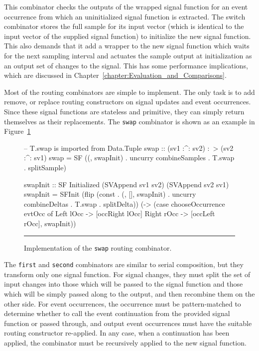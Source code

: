 This combinator checks the outputs of the wrapped
signal function for an event occurrence from which an uninitialized signal
function is extracted. The switch combinator stores the full sample
for its input vector (which is identical to the input vector of the supplied
signal function) to initialize the new signal function. This also demands that
it add a wrapper to the new signal function which waits for the next sampling
interval and actuates the sample output at initialization as an output set
of changes to the signal. This has some performance implications, which are
discussed in Chapter~\ref{chapter:Evaluation_and_Comparisons}.

Most of the routing combinators are simple to implement. The only task is to add
remove, or replace routing constructors on signal updates and event occurrences.
Since these signal functions are stateless and primitive, they can simply
return themselves as their replacements. The {\tt swap} combinator is shown as
an example in Figure~\ref{figure:swap_implementation}

\begin{figure}
\begin{code}
-- T.swap is imported from Data.Tuple
swap :: (sv1 :^: sv2) :~> (sv2 :^: sv1)
swap =
  SF ((, swapInit) . 
      uncurry combineSamples .
      T.swap . splitSample)

swapInit :: SF Initialized (SVAppend sv1 sv2) (SVAppend sv2 sv1)
swapInit =
  SFInit (flip (const .
                (, [], swapInit) .
                uncurry combineDeltas .
                T.swap . splitDelta))
          (\evtOcc ->
             (case chooseOccurrence evtOcc of
                Left lOcc  -> [occRight lOcc]
                Right rOcc -> [occLeft rOcc], swapInit))

\end{code}
\hrule
\caption{Implementation of the {\tt swap} routing combinator.}
\label{figure:swap_implementation}
\end{figure}

The {\tt first} and {\tt second} combinators are similar to serial composition,
but they transform only one signal function. For signal changes, they must split
the set of input changes into those which will be passed to the signal function
and those which will be simply passed along to the output, and then recombine
them on the other side. For event occurrences, the occurrence must be
pattern-matched to determine whether to call the event continuation from the
provided signal function or passed through, and output event occurrences must
have the suitable routing constructor re-applied. In any case, when a
continuation has been applied, the combinator must be recursively applied to the
new signal function.

